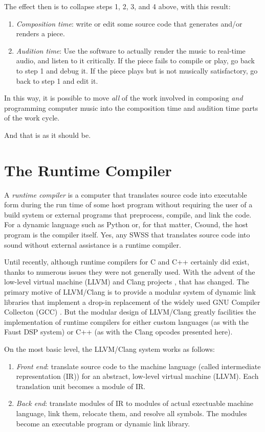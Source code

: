 \documentclass[letterpaper, 12pt]{article}
\begin{document}
The effect then is to collapse steps 1, 2, 3, and 4 above, with this result:

\begin{enumerate}
\item \textit{Composition time}: write or edit some source code that generates and/or renders a piece.
\item \textit{Audition time}: Use the software to actually render the music to real-time audio, and listen to it critically. If the piece fails to compile or play, go back to step 1 and debug it. If the piece plays but is not musically satisfactory, go back to step 1 and edit it.
\end{enumerate}

\indent In this way, it is possible to move \textit{all} of the work involved in composing \textit{and} programming computer music into the composition time and audition time parts of the work cycle.

And that is as it should be.

\section{The Runtime Compiler}

A \textit{runtime compiler} is a computer that translates source code into executable form during the run time of some host program without requiring the user of a build system or external programs that preprocess, compile, and link the code. For a dynamic language such as Python or, for that matter, Csound, the host program is the compiler itself. Yes, any SWSS that translates source code into sound without external assistance is a runtime compiler.

Until recently, although runtime compilers for C and C++ certainly did exist, thanks to numerous issues they were not generally used. With the advent of the low-level virtual machine (LLVM) and Clang projects \citep{llvm}, that has changed. The primary motive of LLVM/Clang is to provide a modular system of dynamic link libraries that implement a drop-in replacement of the widely used GNU Compiler Collecton (GCC) \citep{gcc}. But the modular design of LLVM/Clang greatly facilities the implementation of runtime compilers for either custom languages (as with the Faust DSP system) or C++ (as with the Clang opcodes presented here).

On the most basic level, the LLVM/Clang system works as follows:

\begin{enumerate}
\item \textit{Front end}: translate source code to the machine language (called intermediate representation (IR)) for an abstract, low-level virtual machine (LLVM). Each translation unit becomes a module of IR.
\item \textit{Back end}: translate modules of IR to modules of actual exectuable machine language, link them, relocate them, and resolve all symbols. The modules become an executable program or dynamic link library.
\end{enumerate}
\end{document}
